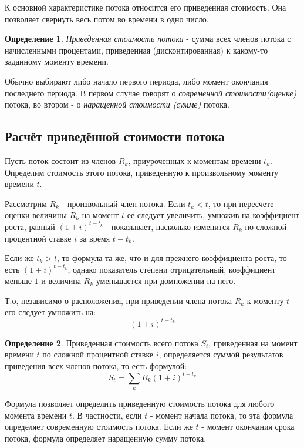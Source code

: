 \documentclass[aps,%
12pt,%
final,%
oneside,
onecolumn,%
musixtex, %
superscriptaddress,%
centertags]{article} %
\theoremstyle{plain}
\theoremstyle{definition}
\newtheorem{definition}{Определение}[subsection]
\theoremstyle{remark}
\begin{document}
К основной характеристике потока относится его приведенная стоимость. Она позволяет свернуть весь потом во времени в одно число. 

\begin{definition}
	\textit{Приведенная стоимость потока} - сумма всех членов потока с начисленными процентами, приведенная (дисконтированная) к какому-то заданному моменту времени. 

	Обычно выбирают либо начало первого периода, либо момент окончания последнего периода. В первом случае говорят о \textit{современной стоимости(оценке)} потока, во втором - о \textit{наращенной стоимости (сумме)} потока. 
\end{definition}


\subsection{Расчёт приведённой стоимости потока}

Пусть поток состоит из членов $R_k$, приуроченных к моментам времени $t_k$. Определим стоимость этого потока, приведенную к произвольному моменту времени $t$.

Рассмотрим $R_k$ - произвольный член потока. Если $t_k < t$, то при пересчете оценки величины $R_k$ на момент $t$ ее следует увеличить, умножив на коэффициент роста, равный $(1+i)^{t-t_k}$ - показывает, насколько изменится $R_k$ по сложной процентной ставке $i$ за время $t - t_k$.

Если же $t_k >t$, то формула та же, что и для прежнего коэффициента роста, то есть $(1+i)^{t-t_k}$, однако показатель степени отрицательный, коэффициент меньше $1$ и величина $R_k$ уменьшается при домножении на него.

Т.о, независимо о расположения, при приведении члена потока $R_k$ к моменту $t$ его следует умножить на:
$$(1+i)^{t-t_k}$$

\begin{definition}
	Приведенная стоимость всего потока $S_t$, приведенная на момент времени $t$ по сложной процентной ставке $i$, определяется суммой результатов приведения всех членов потока, то есть формулой:
	$$S_t= \sum_{k} R_k (1+i)^{t-t_k}$$
\end{definition}

Формула позволяет определить приведенную стоимость потока для любого момента времени $t$. В частности, если $t$ - момент начала потока, то эта формула определяет современную стоимость потока. Если же $t$ - момент окончания срока потока, формула определяет наращенную сумму потока.
\end{document}
